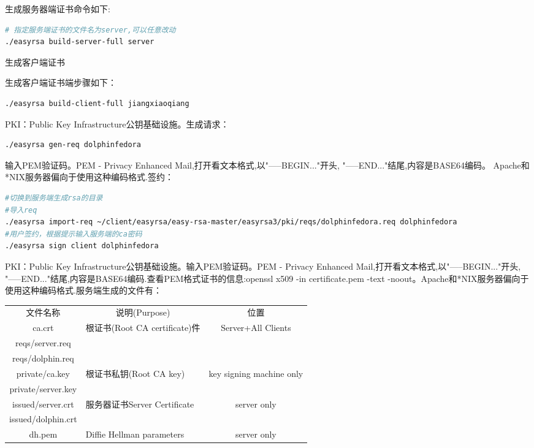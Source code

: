 \documentclass[12pt]{book}
\makeatletter
\numberwithin{dummy}{section}
\theoremstyle{ocrenumbox}
\theoremstyle{blacknumex}
\theoremstyle{blacknumbox}
\theoremstyle{ocrenum}
\renewcommand\paragraph{\@startsection{paragraph}{4}{\z@}
	{-2ex \@plus-.2ex \@minus .2ex}
	{.1ex}
	{\normalfont\small\sffamily\bfseries}}
\makeatother
\begin{document}
生成服务器端证书命令如下:

\begin{lstlisting}[language=Bash]
# 指定服务端证书的文件名为server,可以任意改动
./easyrsa build-server-full server
\end{lstlisting}


\paragraph{生成客户端证书}

生成客户端证书端步骤如下：

\begin{lstlisting}[language=Bash]
./easyrsa build-client-full jiangxiaoqiang
\end{lstlisting}

PKI：Public Key Infrastructure公钥基础设施。生成请求：

\begin{lstlisting}[language=Bash]
./easyrsa gen-req dolphinfedora
\end{lstlisting}

输入PEM验证码。PEM - Privacy Enhanced Mail,打开看文本格式,以"-----BEGIN..."开头, "-----END..."结尾,内容是BASE64编码。
Apache和*NIX服务器偏向于使用这种编码格式.签约：

\begin{lstlisting}[language=Bash]
#切换到服务端生成rsa的目录
#导入req
./easyrsa import-req ~/client/easyrsa/easy-rsa-master/easyrsa3/pki/reqs/dolphinfedora.req dolphinfedora
#用户签约，根据提示输入服务端的ca密码
./easyrsa sign client dolphinfedora
\end{lstlisting}

PKI：Public Key Infrastructure公钥基础设施。输入PEM验证码。PEM - Privacy Enhanced Mail,打开看文本格式,以"-----BEGIN..."开头, "-----END..."结尾,内容是BASE64编码.查看PEM格式证书的信息:openssl x509 -in certificate.pem -text -noout。Apache和*NIX服务器偏向于使用这种编码格式.服务端生成的文件有：

\begin{tabular}{|c|p{5cm}|c|}
	\hline
	\multirow{1}{*}{文件名称}
	& \multicolumn{1}{c|}{说明(Purpose)} 
	& \multicolumn{1}{c|}{位置} \\			
	\cline{1-3}
	ca.crt  & 根证书(Root CA certificate)件 & Server+All Clients	\\
	\hline
	reqs/server.req  & &\\
	\hline
	reqs/dolphin.req  & &\\
	\hline
	private/ca.key & 根证书私钥(Root CA key) & key signing machine only\\
	\hline
	private/server.key && \\
	\hline
	issued/server.crt & 服务器证书Server Certificate & server only\\
	\hline
	issued/dolphin.crt && \\
	\hline
	dh.pem & Diffie Hellman parameters & server only \\
	\hline
\end{tabular}
\end{document}
